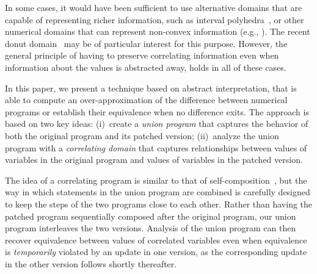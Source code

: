 In some cases, it would have been sufficient to use alternative domains that
are capable of representing richer information, such as interval
polyhedra~\cite{CMWC:SAS09}, or other numerical domains that can represent
non-convex information (e.g., \cite{TODO}). The recent donut
domain~\cite{GIBMG:VMCAI12} may be of particular interest for this purpose.
However, the general principle of having to preserve correlating information
even when information about the values is abstracted away, holds in all of
these cases.






In this paper, we present a technique based on abstract interpretation, that
is able to compute an over-approximation of the difference between numerical
programs or establish their equivalence when no difference exits. The
approach is based on two key ideas: (i)~create a \emph{union program} that
captures the behavior of both the original program and its patched version;
(ii)~analyze the union program with a \emph{correlating domain} that captures
relationships between values of variables in the original program and values
of variables in the patched version.

The idea of a correlating program is similar to that of
self-composition~\cite{BartheDArgenioRezk04,AikenTerauchi05}, but the way in
which statements in the union program are combined is carefully designed to
keep the steps of the two programs close to each other. Rather than having
the patched program sequentially composed after the original program, our
union program interleaves the two versions. Analysis of the union program can
then recover equivalence between values of correlated variables even when
equivalence is \emph{temporarily} violated by an update in one version, as
the corresponding update in the other version follows shortly thereafter.




